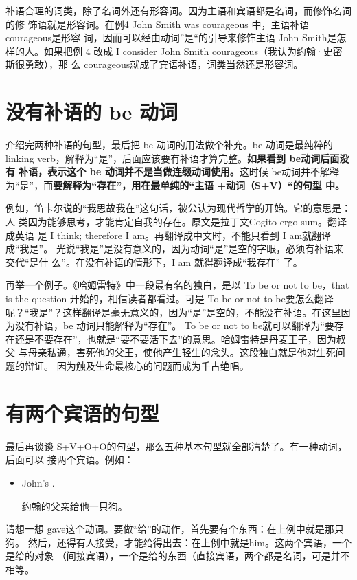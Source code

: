 补语合理的词类，除了名词外还有形容词。因为主语和宾语都是名词，而修饰名词的修
饰语就是形容词。在例4 John Smith was courageous 中，主语补语 courageous是形容
词，因而可以经由动词”是“的引导来修饰主语 John Smith是怎样的人。如果把例 4
改成 I consider John Smith courageous（我认为约翰·史密斯很勇敢），那
么 courageous就成了宾语补语，词类当然还是形容词。

\section{没有补语的 be 动词}

介绍完两种补语的句型，最后把 be 动词的用法做个补充。be 动词是最纯粹的linking
verb，解释为“是”，后面应该要有补语才算完整。\textbf{如果看到 be动词后面没有
  补语，表示这个 be 动词并不是当做连缀动词使用。}这时候 be动词并不解释
为“是”，而\textbf{要解释为“存在”，用在最单纯的“主语 +动词（S+V）“的句型
  中。}

例如，笛卡尔说的“我思故我在”这句话，被公认为现代哲学的开始。它的意思是：人
类因为能够思考，才能肯定自我的存在。原文是拉丁文Cogito ergo sum。翻译成英语
是 I think; therefore I am。再翻译成中文时，不能只看到 I am就翻译成“我是”。
光说“我是”是没有意义的，因为动词“是”是空的字眼，必须有补语来交代“是什
么”。在没有补语的情形下，I am 就得翻译成“我存在” 了。

再举一个例子。《哈姆雷特》中一段最有名的独白，是以 To be or not to be，that
is the question 开始的，相信读者都看过。可是 To be or not to be要怎么翻译
呢？“我是”？这样翻译是毫无意义的，因为“是”是空的，不能没有补语。在这里因
为没有补语，be 动词只能解释为“存在”。 To be or not to be就可以翻译为“要存
在还是不要存在”，也就是“要不要活下去”的意思。哈姆雷特是丹麦王子，因为叔父
与母亲私通，害死他的父王，使他产生轻生的念头。这段独白就是他对生死问题的辩证。
因为触及生命最核心的问题而成为千古绝唱。

\section{有两个宾语的句型}

最后再谈谈 S+V+O+O的句型，那么五种基本句型就全部清楚了。有一种动词，后面可以
接两个宾语。例如：
\begin{itemize}
\item John's    .

  约翰的父亲给他一只狗。
\end{itemize}

请想一想 gave这个动词。要做“给”的动作，首先要有个东西：在上例中就是那只狗。
然后，还得有人接受，才能给得出去：在上例中就是him。这两个宾语，一个是给的对象
（间接宾语），一个是给的东西（直接宾语，两个都是名词，可是并不相等。

